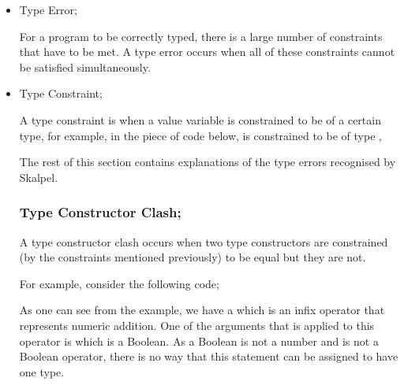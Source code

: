 \documentclass{report}
\begin{document}
\begin{itemize}

\item Type Error;

  \subitem For a program to be correctly typed, there is a large
  number of constraints that have to be met. A type error occurs when
  all of these constraints cannot be satisfied simultaneously.



\item Type Constraint;

  \subitem A type constraint is when a value variable is constrained
  to be of a certain type, for example, in the piece of code below, 
  is constrained to be of type ,


\newpage


{\large The rest of this section contains explanations of the type errors
recognised by Skalpel.}
\vspace{0.1in}
\subsubsection{Type Constructor Clash;}

  \subitem A type constructor clash occurs when two type constructors
  are constrained (by the constraints mentioned previously) to be equal but
  they are not.

  For example, consider the following code;


As one can see from the example, we have a \incodebody{+} which is
an infix operator that represents numeric addition. One of the
arguments that is applied to this operator is 
which is a Boolean. As a Boolean is not a number and \incodebody{+}
is not a Boolean operator, there is no way that this statement can be
assigned to have one type.

 


\end{itemize}
\end{document}
